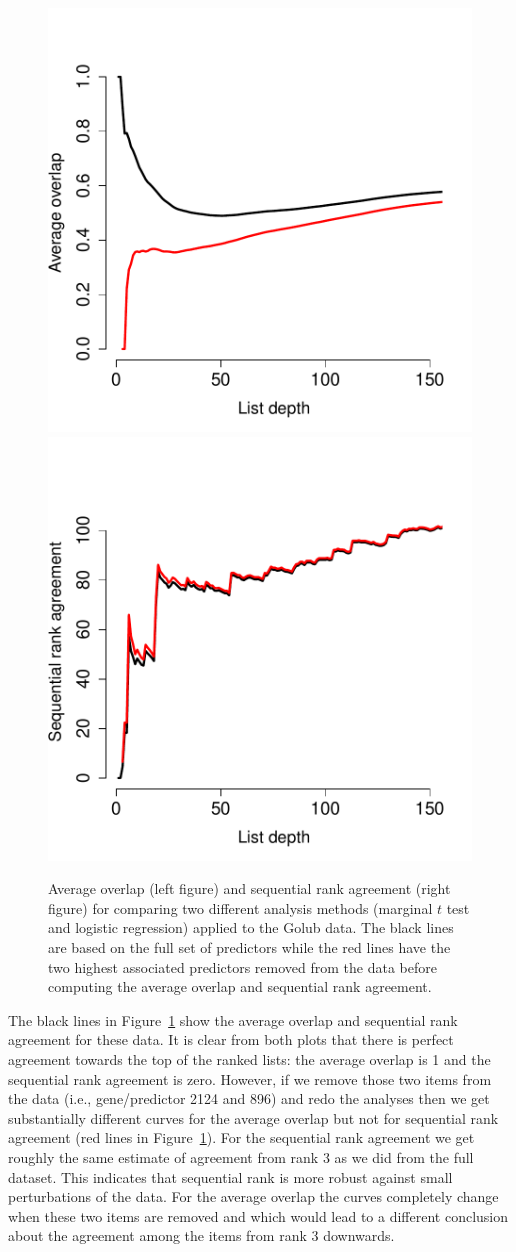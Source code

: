 \documentclass[12pt,a4paper]{article}
\theoremstyle{plain}
\begin{document}
\begin{figure}[htbp]
\begin{center}
\includegraphics[width=.49\textwidth]{paper-fig-ao1}
\includegraphics[width=.49\textwidth]{paper-fig-ao2}
\end{center}
 \caption{Average overlap (left figure) and sequential rank agreement
 (right figure) for comparing two different analysis methods
 (marginal $t$ test and logistic regression)
    applied to the Golub data. The black lines are based on the full
    set of predictors while the red lines have the two highest
    associated predictors removed
    from the data before computing the average overlap and sequential
    rank agreement.}
  \label{fig:case1}
 \end{figure}

 The black lines in Figure~\ref{fig:case1} show the average overlap
 and sequential rank agreement for these data. It is clear from both
 plots that there is perfect agreement towards the top of the ranked
 lists: the average overlap is 1 and the sequential rank agreement is
 zero.  However, if we remove those two items from the data (i.e.,
 gene/predictor 2124 and 896) and redo the analyses then we get
 substantially different curves for the average overlap but not for
 sequential rank agreement (red lines in Figure~\ref{fig:case1}). For
 the sequential rank agreement we get roughly the same estimate of
 agreement from rank 3 as we did from the full dataset. This indicates
 that sequential rank is more robust against small perturbations of
 the data. For the average overlap the curves completely change when
 these two items are removed and which would lead to a different
 conclusion about the agreement among the items from rank 3 downwards.
\end{document}
